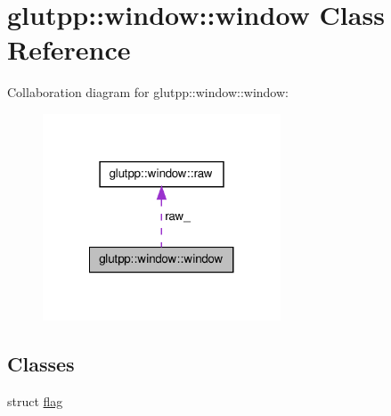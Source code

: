 \hypertarget{classglutpp_1_1window_1_1window}{\section{glutpp\-:\-:window\-:\-:window \-Class \-Reference}
\label{classglutpp_1_1window_1_1window}
}


\-Collaboration diagram for glutpp\-:\-:window\-:\-:window\-:\nopagebreak
\begin{figure}[H]
\begin{center}
\leavevmode
\includegraphics[width=200pt]{classglutpp_1_1window_1_1window__coll__graph}
\end{center}
\end{figure}
\subsection*{\-Classes}
\begin{DoxyCompactItemize}
\item 
struct \hyperlink{structglutpp_1_1window_1_1window_1_1flag}{flag}
\end{DoxyCompactItemize}
